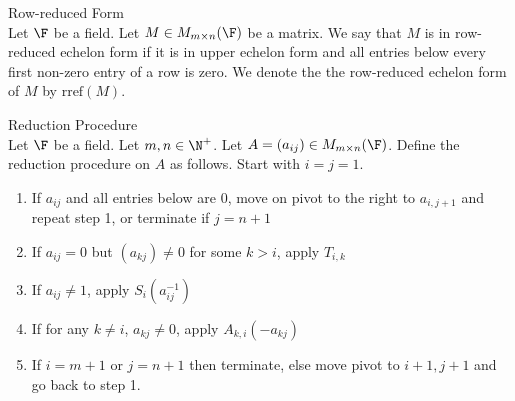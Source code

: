 \documentclass[a4paper]{article}
\begin{document}
\begin{defn}{Row-reduced Form}{}\\
Let $\F$ be a field. Let $M\in M_{m\times n}(\F)$ be a matrix. We say that $M$ is in row-reduced echelon form if it is in upper echelon form and all entries below every first non-zero entry of a row is zero. We denote the the row-reduced echelon form of $M$ by $\text{rref}(M)$. 
\end{defn}

\begin{defn}{Reduction Procedure}{}\\
Let $\F$ be a field. Let $m,n\in\N^+$. Let $A=(a_{ij})\in M_{m\times n}(\F)$. Define the reduction procedure on $A$ as follows. Start with $i=j=1$. 
\begin{enumerate}
\item If $a_{ij}$ and all entries below are $0$, move on pivot to the right to $a_{i,j+1}$ and repeat step 1, or terminate if $j=n+1$
\item If $a_{ij}=0$ but $(a_{kj})\neq 0$ for some $k>i$, apply $T_{i,k}$
\item If $a_{ij}\neq 1$, apply $S_i(a_{ij}^{-1})$
\item If for any $k\neq i$, $a_{kj}\neq 0$, apply $A_{k,i}(-a_{kj})$
\item If $i=m+1$ or $j=n+1$ then terminate, else move pivot to $i+1,j+1$ and go back to step 1. 
\end{enumerate}
\end{defn}
\end{document}
